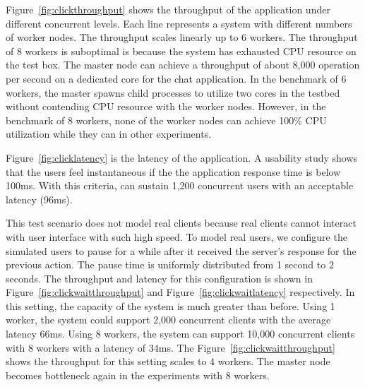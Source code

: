 Figure~\ref{fig:clickthroughput} shows the throughput of the application 
under different concurrent levels.
Each line represents a \cb{} system with different numbers of worker nodes.
The throughput scales linearly up to 6 workers.
The throughput of 8 workers is suboptimal is because
the system has exhausted CPU resource on the test box.
The master node can achieve a throughput of about 8,000 operation per second on a dedicated core for the
chat application.
In the benchmark of 6 workers, the master spawns child processes to utilize two cores in the testbed 
without contending CPU resource with the worker nodes.
However, in the benchmark of 8 workers, none of the worker nodes can achieve 100\% CPU
utilization while they can in other experiments.

\clicklatency{}

Figure~\ref{fig:clicklatency} is the latency of the application.
A usability study shows that the users feel instantaneous if the 
the application response time is below 100ms.
With this criteria,
\cb{} can sustain 1,200 concurrent users with an acceptable latency (96ms).


This test scenario does not model real clients because real clients cannot 
interact with user interface with such high speed.
To model real users, we configure the simulated users to pause for a while
after it received the server's response for the previous action.
The pause time is uniformly distributed from 1 second to 2 seconds.
The throughput and latency for this configuration is shown 
in Figure~\ref{fig:clickwaitthroughput} and Figure~\ref{fig:clickwaitlatency} respectively.
In this setting, the capacity of the system is much greater than before.
Using 1 worker, the system could support 2,000 concurrent clients with the average latency 66ms.
Using 8 workers, 
the system can support 10,000 concurrent clients with 8 workers with a latency of 34ms.
The Figure~\ref{fig:clickwaitthroughput} shows the throughput for this setting 
scales to 4 workers.
The master node becomes bottleneck again in the experiments with 8 workers.


\clickwaitthroughput{}
\clickwaitlatency{}

\chatappfig{}

